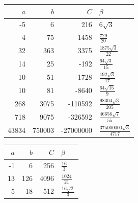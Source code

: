 \begin{identitytable}\centering\footnotesize
\caption{Euler companions of the standard level 3 identities.}
\label{tab:euler3}
\setlength{\tabcolsep}{3pt}
\begin{tabular}{@{}rrrl@{}}\toprule
$a$ & $b$ & $C$ & $\beta$\\\midrule
-5&6&216&$6 \sqrt{3}$\\
4&75&1458&$\frac{729}{20}$\\
32&363&3375&$\frac{1875 \sqrt{3}}{22}$\\
14&25&-192&$\frac{64 \sqrt{3}}{15}$\\
10&51&-1728&$\frac{192 \sqrt{3}}{17}$\\
10&81&-8640&$\frac{64 \sqrt{15}}{9}$\\
268&3075&-110592&$\frac{98304 \sqrt{3}}{205}$\\
718&9075&-326592&$\frac{46656 \sqrt{7}}{55}$\\
43834&750003&-27000000&$\frac{375000000 \sqrt{3}}{4717}$\\
\bottomrule\end{tabular}\end{identitytable}
\begin{identitytable}\centering\footnotesize
\caption{Euler companions of the standard level 4 identities.}
\label{tab:euler4}
\setlength{\tabcolsep}{3pt}
\begin{tabular}{@{}rrrl@{}}\toprule
$a$ & $b$ & $C$ & $\beta$\\\midrule
-1&6&256&$\frac{16}{3}$\\
13&126&4096&$\frac{1024}{21}$\\
5&18&-512&$\frac{16 \sqrt{2}}{3}$\\
\bottomrule\end{tabular}\end{identitytable}
